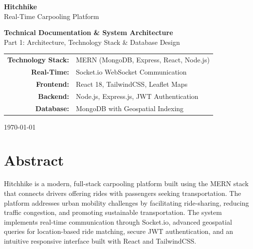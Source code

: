 \documentclass[12pt,a4paper]{article}
\begin{document}
\begin{titlepage}
    \centering
    \vspace*{2cm}
    
    {\Huge\bfseries Hitchhike\\[0.5cm]}
    {\LARGE Real-Time Carpooling Platform\\[0.2cm]}
    \vspace{1cm}
    
    {\Large\textbf{Technical Documentation \& System Architecture}\\[0.5cm]}
    {\large Part 1: Architecture, Technology Stack \& Database Design\\[2cm]}
    
    \vspace{1.5cm}
    
    \begin{tabular}{rl}
        \textbf{Technology Stack:} & MERN (MongoDB, Express, React, Node.js) \\[0.3cm]
        \textbf{Real-Time:} & Socket.io WebSocket Communication \\[0.3cm]
        \textbf{Frontend:} & React 18, TailwindCSS, Leaflet Maps \\[0.3cm]
        \textbf{Backend:} & Node.js, Express.js, JWT Authentication \\[0.3cm]
        \textbf{Database:} & MongoDB with Geospatial Indexing \\[0.3cm]
    \end{tabular}
    
    \vfill
    
    {\large \today\\[2cm]}
    
\end{titlepage}

\tableofcontents
\newpage

\section*{Abstract}

Hitchhike is a modern, full-stack carpooling platform built using the MERN stack that connects drivers offering rides with passengers seeking transportation. The platform addresses urban mobility challenges by facilitating ride-sharing, reducing traffic congestion, and promoting sustainable transportation. The system implements real-time communication through Socket.io, advanced geospatial queries for location-based ride matching, secure JWT authentication, and an intuitive responsive interface built with React and TailwindCSS.
\end{document}
